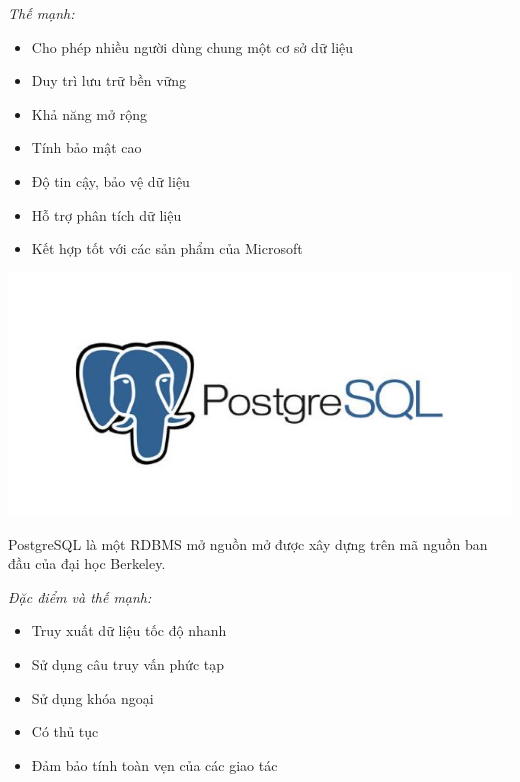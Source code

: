 \textit{Thế mạnh:}
\begin{itemize}
    \item Cho phép nhiều người dùng chung một cơ sở dữ liệu
    \item Duy trì lưu trữ bền vững
    \item Khả năng mở rộng
    \item Tính bảo mật cao
    \item Độ tin cậy, bảo vệ dữ liệu
    \item Hỗ trợ phân tích dữ liệu
    \item Kết hợp tốt với các sản phẩm của Microsoft
\end{itemize}

\begin{center}
  \captionsetup{type=figure}
    \includegraphics[scale=0.5]{img/postgre-sql.jpg}
\end{center}

PostgreSQL là một RDBMS mở nguồn mở được xây dựng trên mã nguồn ban đầu của đại học Berkeley.

\textit{Đặc điểm và thế mạnh:}
\begin{itemize}
    \item Truy xuất dữ liệu tốc độ nhanh
    \item Sử dụng câu truy vấn phức tạp
    \item Sử dụng khóa ngoại
    \item Có thủ tục
    \item Đảm bảo tính toàn vẹn của các giao tác
\end{itemize}

